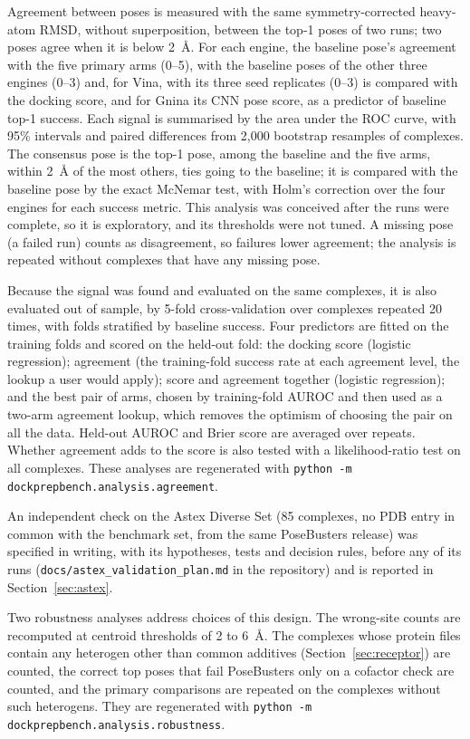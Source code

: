 Agreement between poses is measured with the same symmetry-corrected heavy-atom RMSD, without
superposition, between the top-1 poses of two runs; two poses agree when it is below
\SI{2}{\angstrom}. For each engine, the baseline pose's agreement with the five primary arms
(0--5), with the baseline poses of the other three engines (0--3) and, for Vina, with its three
seed replicates (0--3) is compared with the docking score, and for Gnina its CNN pose score, as a
predictor of baseline top-1 success. Each signal is summarised by the area under the ROC curve,
with 95\% intervals and paired differences from 2,000 bootstrap resamples of complexes. The
consensus pose is the top-1 pose, among the baseline and the five arms, within \SI{2}{\angstrom}
of the most others, ties going to the baseline; it is compared with the baseline pose by the
exact McNemar test, with Holm's correction over the four engines for each success metric. This
analysis was conceived after the runs were complete, so it is exploratory, and its thresholds
were not tuned. A missing pose (a failed run) counts as disagreement, so failures lower
agreement; the analysis is repeated without complexes that have any missing pose.

Because the signal was found and evaluated on the same complexes, it is also evaluated out
of sample, by 5-fold cross-validation over complexes repeated 20 times, with folds stratified
by baseline success. Four predictors are fitted on the training folds and scored on the
held-out fold: the docking score (logistic regression); agreement (the training-fold
success rate at each agreement level, the lookup a user would apply); score and agreement
together (logistic regression); and the best pair of arms, chosen by training-fold AUROC
and then used as a two-arm agreement lookup, which removes the optimism of choosing the pair
on all the data. Held-out AUROC and Brier score are averaged over repeats. Whether
agreement adds to the score is also tested with a likelihood-ratio test on all complexes.
These analyses are regenerated with \texttt{python -m dockprepbench.analysis.agreement}.

An independent check on the Astex Diverse Set (85 complexes, no PDB entry in common with the
benchmark set, from the same PoseBusters release) was specified in writing, with its
hypotheses, tests and decision rules, before any of its runs
(\texttt{docs/astex\_validation\_plan.md} in the repository) and is reported in
Section~\ref{sec:astex}.

Two robustness analyses address choices of this design. The
wrong-site counts are recomputed at centroid thresholds of 2 to \SI{6}{\angstrom}. The
complexes whose protein files contain any heterogen other than common additives
(Section~\ref{sec:receptor}) are counted, the correct top poses that fail
PoseBusters only on a cofactor check are counted, and the primary comparisons are repeated
on the complexes without such heterogens. They are regenerated with
\texttt{python -m dockprepbench.analysis.robustness}.

